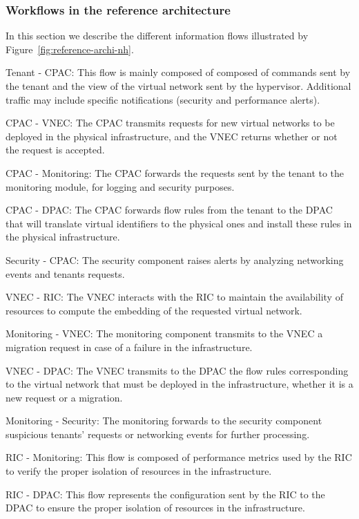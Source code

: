 \subsubsection{Workflows in the reference architecture}
In this section we describe the different information flows illustrated by Figure~\ref{fig:reference-archi-nh}.

 Tenant - CPAC: This flow is mainly composed of composed of commands sent by the tenant and the view of the virtual network sent by the hypervisor. Additional traffic may include specific notifications (\eg security and performance alerts).

 CPAC - VNEC: The CPAC transmits requests for new virtual networks to be deployed in the physical infrastructure, and the VNEC returns whether or not the request is accepted.

 CPAC - Monitoring: The CPAC forwards the requests sent by the tenant to the monitoring module, for logging and security purposes. 

 CPAC - DPAC: The CPAC forwards flow rules from the tenant to the DPAC that will translate virtual identifiers to the physical ones and install these rules in the physical infrastructure.

 Security - CPAC: The security component raises alerts by analyzing networking events and tenants requests.

 VNEC - RIC: The VNEC interacts with the RIC to maintain the availability of resources to compute the embedding of the requested virtual network.

 Monitoring - VNEC: The monitoring component transmits to the VNEC a migration request in case of a failure in the infrastructure.

 VNEC - DPAC: The VNEC transmits to the DPAC the flow rules corresponding to the virtual network that must be deployed in the infrastructure, whether it is a new request or a migration.

 Monitoring - Security: The monitoring forwards to the security component suspicious tenants' requests or networking events for further processing.

 RIC - Monitoring: This flow is composed of performance metrics used by the RIC to verify the proper isolation of resources in the infrastructure.

 RIC - DPAC: This flow represents the configuration sent by the RIC to the DPAC to ensure the proper isolation of resources in the infrastructure.

